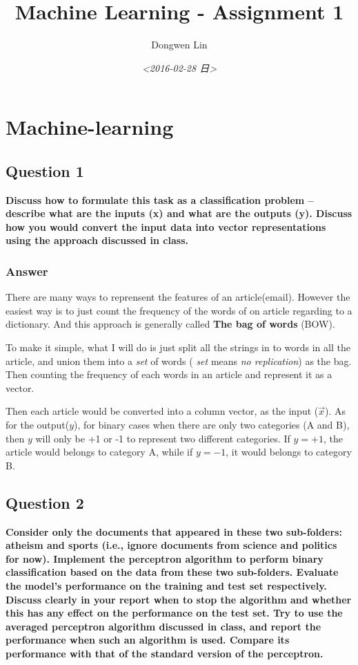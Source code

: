 \documentclass{article}
\author{Dongwen Lin}
\date{\textit{<2016-02-28 日>}}
\title{Machine Learning - Assignment 1}
\begin{document}
\maketitle
\setcounter{tocdepth}{2}
\tableofcontents

\section{Machine-learning}
\label{sec-1}
\subsection{Question 1}
\label{sec-1-1}

\textbf{Discuss how to formulate this task as a classification problem – describe what are the inputs (x) and what are the outputs (y). Discuss how you would convert the input data into vector representations using the approach discussed in class.}

\subsubsection{Answer}
\label{sec-1-1-1}

There are many ways to reprensent the features of an article(email). However the
easiest way is to just count the frequency of the words of on article regarding
to a dictionary. And this approach is generally called \textbf{The bag of words} (BOW). 

To make it simple, what I will do is just split all the strings in to words in all the article, and union them into a \emph{set} of words ( \emph{set} means \emph{no replication}) as the bag. Then counting the frequency of each words in an article and represent it as a vector.

Then each article would be converted into a column vector, as the input ($\vec{x}$). As for the output($y$), for binary cases when there are only two categories (A and B), then $y$ will only be +1 or -1 to represent two different categories. If $y = +1$, the article would belongs to category A, while if $y = -1$, it would belongs to category B.

\subsection{Question 2}
\label{sec-1-2}

\textbf{Consider only the documents that appeared in these two sub-folders: atheism and sports (i.e., ignore documents from science and politics for now). Implement the perceptron algorithm to perform binary classification based on the data from these two sub-folders. Evaluate the model’s performance on the training and test set respectively. Discuss clearly in your report when to stop the algorithm and whether this has any effect on the performance on the test set. Try to use the averaged perceptron algorithm discussed in class, and report the performance when such an algorithm is used. Compare its performance with that of the standard version of the perceptron.} 
\end{document}
